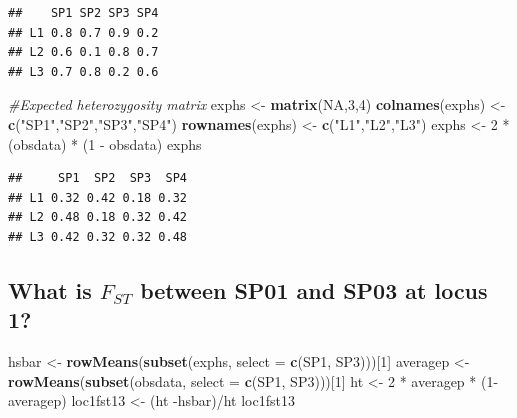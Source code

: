 \documentclass[]{article}
\newenvironment{Shaded}{\begin{snugshade}}{\end{snugshade}}
\newcommand{\KeywordTok}[1]{\textcolor[rgb]{0.13,0.29,0.53}{\textbf{{#1}}}}
\newcommand{\DataTypeTok}[1]{\textcolor[rgb]{0.13,0.29,0.53}{{#1}}}
\newcommand{\DecValTok}[1]{\textcolor[rgb]{0.00,0.00,0.81}{{#1}}}
\newcommand{\StringTok}[1]{\textcolor[rgb]{0.31,0.60,0.02}{{#1}}}
\newcommand{\CommentTok}[1]{\textcolor[rgb]{0.56,0.35,0.01}{\textit{{#1}}}}
\newcommand{\OtherTok}[1]{\textcolor[rgb]{0.56,0.35,0.01}{{#1}}}
\newcommand{\NormalTok}[1]{{#1}}
\begin{document}
\begin{verbatim}
##    SP1 SP2 SP3 SP4
## L1 0.8 0.7 0.9 0.2
## L2 0.6 0.1 0.8 0.7
## L3 0.7 0.8 0.2 0.6
\end{verbatim}

\begin{Shaded}
\begin{Highlighting}[]
\CommentTok{#Expected heterozygosity matrix}
\NormalTok{exphs <-}\StringTok{ }\KeywordTok{matrix}\NormalTok{(}\OtherTok{NA}\NormalTok{,}\DecValTok{3}\NormalTok{,}\DecValTok{4}\NormalTok{)}
\KeywordTok{colnames}\NormalTok{(exphs) <-}\StringTok{ }\KeywordTok{c}\NormalTok{(}\StringTok{"SP1"}\NormalTok{,}\StringTok{"SP2"}\NormalTok{,}\StringTok{"SP3"}\NormalTok{,}\StringTok{"SP4"}\NormalTok{)}
\KeywordTok{rownames}\NormalTok{(exphs) <-}\StringTok{ }\KeywordTok{c}\NormalTok{(}\StringTok{"L1"}\NormalTok{,}\StringTok{"L2"}\NormalTok{,}\StringTok{"L3"}\NormalTok{)}
\NormalTok{exphs <-}\StringTok{ }\DecValTok{2} \NormalTok{*}\StringTok{ }\NormalTok{(obsdata) *}\StringTok{ }\NormalTok{(}\DecValTok{1} \NormalTok{-}\StringTok{ }\NormalTok{obsdata)}
\NormalTok{exphs}
\end{Highlighting}
\end{Shaded}

\begin{verbatim}
##     SP1  SP2  SP3  SP4
## L1 0.32 0.42 0.18 0.32
## L2 0.48 0.18 0.32 0.42
## L3 0.42 0.32 0.32 0.48
\end{verbatim}

\pagebreak  

\subsection{What is $F_{ST}$ between SP01 and SP03 at locus
1?}\label{what-is-fux5fst-between-sp01-and-sp03-at-locus-1}

\begin{Shaded}
\begin{Highlighting}[]
\NormalTok{hsbar <-}\StringTok{ }\KeywordTok{rowMeans}\NormalTok{(}\KeywordTok{subset}\NormalTok{(exphs, }\DataTypeTok{select =} \KeywordTok{c}\NormalTok{(SP1, SP3)))[}\DecValTok{1}\NormalTok{]}
\NormalTok{averagep <-}\StringTok{ }\KeywordTok{rowMeans}\NormalTok{(}\KeywordTok{subset}\NormalTok{(obsdata, }\DataTypeTok{select =} \KeywordTok{c}\NormalTok{(SP1, SP3)))[}\DecValTok{1}\NormalTok{]}
\NormalTok{ht <-}\StringTok{ }\DecValTok{2} \NormalTok{*}\StringTok{ }\NormalTok{averagep *}\StringTok{ }\NormalTok{(}\DecValTok{1}\NormalTok{-averagep)}
\NormalTok{loc1fst13 <-}\StringTok{ }\NormalTok{(ht -hsbar)/ht}
\NormalTok{loc1fst13}
\end{Highlighting}
\end{Shaded}
\end{document}
